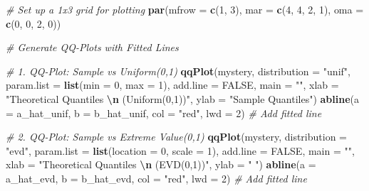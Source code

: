 \documentclass[
]{article}
\newenvironment{Shaded}{\begin{snugshade}}{\end{snugshade}}
\newcommand{\AttributeTok}[1]{\textcolor[rgb]{0.13,0.29,0.53}{#1}}
\newcommand{\CommentTok}[1]{\textcolor[rgb]{0.56,0.35,0.01}{\textit{#1}}}
\newcommand{\ConstantTok}[1]{\textcolor[rgb]{0.56,0.35,0.01}{#1}}
\newcommand{\DecValTok}[1]{\textcolor[rgb]{0.00,0.00,0.81}{#1}}
\newcommand{\FunctionTok}[1]{\textcolor[rgb]{0.13,0.29,0.53}{\textbf{#1}}}
\newcommand{\NormalTok}[1]{#1}
\newcommand{\SpecialCharTok}[1]{\textcolor[rgb]{0.81,0.36,0.00}{\textbf{#1}}}
\newcommand{\StringTok}[1]{\textcolor[rgb]{0.31,0.60,0.02}{#1}}
\begin{document}
\begin{Shaded}
\begin{Highlighting}[]
\CommentTok{\# Set up a 1x3 grid for plotting}
\FunctionTok{par}\NormalTok{(}\AttributeTok{mfrow =} \FunctionTok{c}\NormalTok{(}\DecValTok{1}\NormalTok{, }\DecValTok{3}\NormalTok{), }\AttributeTok{mar =} \FunctionTok{c}\NormalTok{(}\DecValTok{4}\NormalTok{, }\DecValTok{4}\NormalTok{, }\DecValTok{2}\NormalTok{, }\DecValTok{1}\NormalTok{), }\AttributeTok{oma =} \FunctionTok{c}\NormalTok{(}\DecValTok{0}\NormalTok{, }\DecValTok{0}\NormalTok{, }\DecValTok{2}\NormalTok{, }\DecValTok{0}\NormalTok{))}

\CommentTok{\# Generate QQ{-}Plots with Fitted Lines}

\CommentTok{\# 1. QQ{-}Plot: Sample vs Uniform(0,1)}
\FunctionTok{qqPlot}\NormalTok{(mystery, }\AttributeTok{distribution =} \StringTok{"unif"}\NormalTok{,}
       \AttributeTok{param.list =} \FunctionTok{list}\NormalTok{(}\AttributeTok{min =} \DecValTok{0}\NormalTok{, }\AttributeTok{max =} \DecValTok{1}\NormalTok{),}
       \AttributeTok{add.line =} \ConstantTok{FALSE}\NormalTok{, }\AttributeTok{main =} \StringTok{""}\NormalTok{,}
       \AttributeTok{xlab =} \StringTok{"Theoretical Quantiles }\SpecialCharTok{\textbackslash{}n}\StringTok{ (Uniform(0,1))"}\NormalTok{,}
       \AttributeTok{ylab =} \StringTok{"Sample Quantiles"}\NormalTok{)}
\FunctionTok{abline}\NormalTok{(}\AttributeTok{a =}\NormalTok{ a\_hat\_unif, }\AttributeTok{b =}\NormalTok{ b\_hat\_unif, }\AttributeTok{col =} \StringTok{"red"}\NormalTok{, }\AttributeTok{lwd =} \DecValTok{2}\NormalTok{)  }\CommentTok{\# Add fitted line}

\CommentTok{\# 2. QQ{-}Plot: Sample vs Extreme Value(0,1)}
\FunctionTok{qqPlot}\NormalTok{(mystery, }\AttributeTok{distribution =} \StringTok{"evd"}\NormalTok{,}
       \AttributeTok{param.list =} \FunctionTok{list}\NormalTok{(}\AttributeTok{location =} \DecValTok{0}\NormalTok{, }\AttributeTok{scale =} \DecValTok{1}\NormalTok{),}
       \AttributeTok{add.line =} \ConstantTok{FALSE}\NormalTok{, }\AttributeTok{main =} \StringTok{""}\NormalTok{,}
       \AttributeTok{xlab =} \StringTok{"Theoretical Quantiles }\SpecialCharTok{\textbackslash{}n}\StringTok{ (EVD(0,1))"}\NormalTok{,}
       \AttributeTok{ylab =} \StringTok{" "}\NormalTok{)}
\FunctionTok{abline}\NormalTok{(}\AttributeTok{a =}\NormalTok{ a\_hat\_evd, }\AttributeTok{b =}\NormalTok{ b\_hat\_evd, }\AttributeTok{col =} \StringTok{"red"}\NormalTok{, }\AttributeTok{lwd =} \DecValTok{2}\NormalTok{)  }\CommentTok{\# Add fitted line}


\end{Highlighting}
\end{Shaded}
\end{document}
